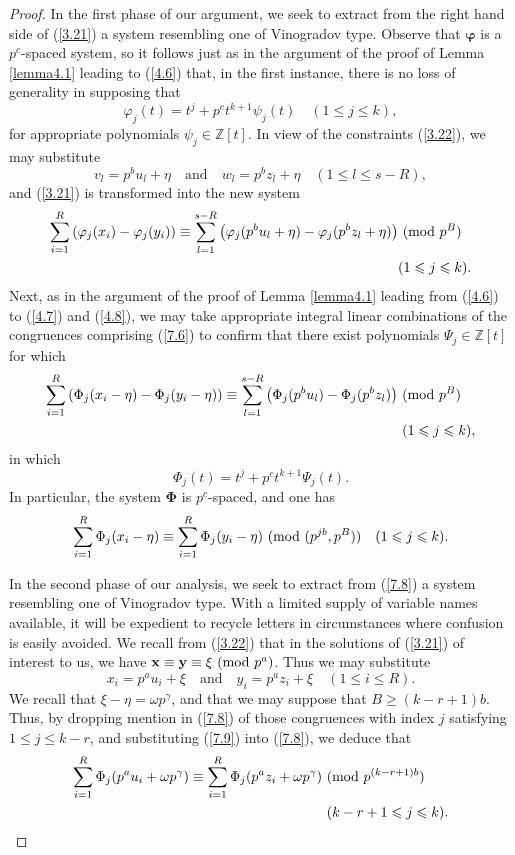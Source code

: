 \documentclass[12pt,reqno]{amsart}
\theoremstyle{definition}
\theoremstyle{remark}
\numberwithin{equation}{section}
\newcommand{\mmod}[1]{\,\,(\text{\rm mod}\,\,#1)}
\def\bfx{{\mathbf x}}
\def\bfy{{\mathbf y}}
\def\dbZ{{\mathbb Z}}\def\dbQ{{\mathbb Q}}
\def\gam{{\gamma}} \def\Gam{{\Gamma}}
\def\bfPhi{{\boldsymbol \Phi}} \def\bfvarphi{{\boldsymbol \varphi}}
\def\ome{{\omega}} \def\Ome{{\Omega}}
\def\le{\leqslant} \def\ge{\geqslant} \def\pleq{\preccurlyeq} \def\ple{\prec}
\begin{document}
\begin{proof}
In the first phase of our argument, we seek to extract from the right hand side of 
(\ref{3.21}) a system resembling one of Vinogradov type. Observe that $\bfvarphi$ is a 
$p^c$-spaced system, so it follows just as in the argument of the proof of Lemma 
\ref{lemma4.1} leading to (\ref{4.6}) that, in the first instance, there is no loss of 
generality in supposing that
$$\varphi_j(t)=t^j+p^ct^{k+1}\psi_j(t)\quad (1\le j\le k),$$
for appropriate polynomials $\psi_j\in \dbZ[t]$. In view of the constraints (\ref{3.22}), we 
may substitute
$$v_l=p^bu_l+\eta\quad \text{and}\quad w_l=p^bz_l+\eta\quad (1\le l\le s-R),$$
and (\ref{3.21}) is transformed into the new system
\begin{align}
\sum_{i=1}^R\left(\varphi_j(x_i)-\varphi_j(y_i)\right)\equiv \sum_{l=1}^{s-R}
\left( \varphi_j(p^bu_l+\eta)-\varphi_j(p^bz_l+\eta)\right) &\mmod{p^B}\notag \\
&(1\le j\le k).\label{7.6}
\end{align}
Next, as in the argument of the proof of Lemma \ref{lemma4.1} leading from (\ref{4.6}) to 
(\ref{4.7}) and (\ref{4.8}), we may take appropriate integral linear combinations of the 
congruences comprising (\ref{7.6}) to confirm that there exist polynomials 
$\Psi_j\in \dbZ[t]$ for which
\begin{align*}
\sum_{i=1}^R\left(\Phi_j(x_i-\eta)-\Phi_j(y_i-\eta)\right)\equiv \sum_{l=1}^{s-R}\left( 
\Phi_j(p^bu_l)-\Phi_j(p^bz_l)\right) &\mmod{p^B}\\
&\ (1\le j\le k),
\end{align*}
in which
\begin{equation}\label{7.7}
\Phi_j(t)=t^j+p^ct^{k+1}\Psi_j(t).
\end{equation}
In particular, the system $\bfPhi$ is $p^c$-spaced, and one has
\begin{equation}\label{7.8}
\sum_{i=1}^R\Phi_j(x_i-\eta)\equiv \sum_{i=1}^R\Phi_j(y_i-\eta)\mmod{(p^{jb},p^B)}
\quad (1\le j\le k).
\end{equation}

\par In the second phase of our analysis, we seek to extract from (\ref{7.8}) a system 
resembling one of Vinogradov type. With a limited supply of variable names available, it will 
be expedient to recycle letters in circumstances where confusion is easily avoided. We recall 
from (\ref{3.22}) that in the solutions of (\ref{3.21}) of interest to us, we have 
$\bfx\equiv \bfy\equiv \xi\mmod{p^a}$. Thus we may substitute
\begin{equation}\label{7.9}
x_i=p^au_i+\xi\quad \text{and}\quad y_i=p^az_i+\xi\quad (1\le i\le R).
\end{equation}
We recall that $\xi-\eta=\ome p^\gam$, and that we may suppose that $B\ge (k-r+1)b$. 
Thus, by dropping mention in (\ref{7.8}) of those congruences with index $j$ satisfying 
$1\le j\le k-r$, and substituting (\ref{7.9}) into (\ref{7.8}), we deduce that
\begin{align}\label{7.10}
\sum_{i=1}^R\Phi_j(p^au_i+\ome p^\gam)\equiv \sum_{i=1}^R\Phi_j(p^az_i+\ome 
p^\gam)&\mmod{p^{(k-r+1)b}}\notag \\
&\ (k-r+1\le j\le k).
\end{align}


\end{proof}
\end{document}
